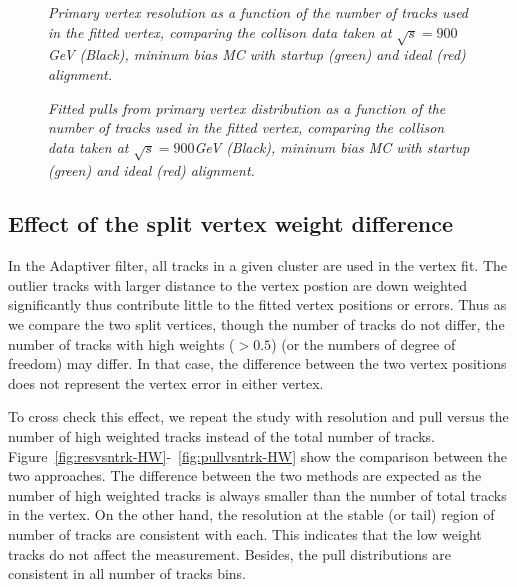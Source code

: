 \begin{figure}[htb]
\begin{center}
\centerline{
}
\caption{\sl
Primary vertex resolution as a function of the number of tracks used in the 
fitted vertex, comparing the collison data taken at $\sqrt{s}=900$GeV (Black), 
mininum bias MC with startup (green) and ideal (red) alignment. }
\label{fig:resvsntrk-aligncheck}
\end{center}
\begin{center}
\centerline{
}
\caption{\sl
Fitted pulls from primary vertex distribution 
as a function of the number of tracks used 
in the fitted vertex,  comparing the collison data taken at $\sqrt{s}=900$GeV (Black), 
mininum bias MC with startup (green) and ideal (red) alignment. }
\label{fig:pullvsntrk-aligncheck}
\end{center}
\end{figure}


\subsection{Effect of the split vertex weight difference}
\label{sub:weight}

In the Adaptiver filter, all tracks in a given cluster are used in the 
vertex fit. The outlier tracks with larger distance to the vertex postion are 
down weighted significantly thus contribute little to the fitted vertex 
positions or errors. 
Thus as we compare the two split vertices, though the number of tracks do not 
differ, the number of tracks with high weights ($>0.5$) (or the numbers of degree of freedom) may differ. 
In that case, the difference between the two vertex positions does not 
represent the vertex error in either vertex. 

To cross check this effect, we repeat the study with resolution 
and pull versus the number of high weighted tracks instead of the total number 
of tracks. 
Figure~\ref{fig:resvsntrk-HW}-~\ref{fig:pullvsntrk-HW} show the comparison 
between the two approaches. 
The difference between the two methods are expected as the number of high 
weighted tracks is always smaller than the number of total tracks in the 
vertex. On the other hand, the resolution at the stable (or tail) region 
of number of tracks are consistent with each. This indicates that 
the low weight tracks do not affect the measurement. 
Besides, the pull distributions are consistent in all number of tracks bins.

